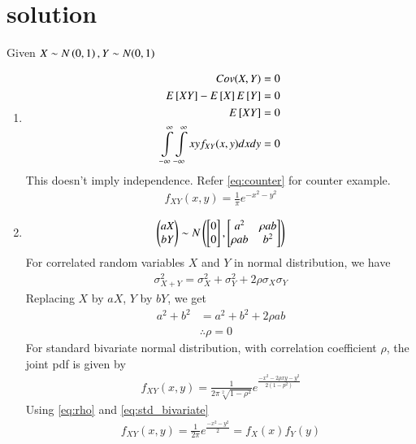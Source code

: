 \documentclass[journal,12pt,twocolumn]{IEEEtran}
\begin{document}
\section{solution}
Given $X\sim N\left(0,1\right), Y\sim N(0,1)$
\begin{enumerate}
\item
\begin{align}
Cov(X,Y)=0\\
E{}\left[XY\right]-E{}\left[X\right]E{}\left[Y\right]=0\\
E{}\left[XY\right]=0\\
\displaystyle \int\limits_{-\infty}^{\infty} \int\limits_{-\infty}^{\infty}xyf_{XY}(x,y) dxdy=0
\end{align}
This doesn't imply independence. Refer \eqref{eq:counter} for counter example.
\begin{align}
f_{XY}(x,y)=\frac{1}{\pi}e^{-x^2-y^2} \label{eq:counter}
\end{align}
\item
\begin{align}
\begin{pmatrix}
aX\\
bY
\end{pmatrix}
\sim N\left(\begin{bmatrix}0\\0\end{bmatrix},\begin{bmatrix}a^2&\rho ab\\\rho ab&b^2\end{bmatrix}\right)
\end{align}
For correlated random variables $X$ and $Y$ in normal distribution, we have
\begin{align}
\sigma_{X+Y}^2=\sigma_X^2+\sigma_Y^2+2\rho\sigma_X\sigma_Y
\end{align}
Replacing $X$ by $aX$, $Y$ by $bY$, we get
\begin{align}
a^2+b^2&=a^2+b^2+2\rho ab\\
&\therefore \rho=0\label{eq:rho}
\end{align}
For standard bivariate normal distribution, with correlation coefficient $\rho$, the joint pdf is given by
\begin{align}
f_{XY}(x,y)=\frac{1}{2\pi\sqrt[2]{1-\rho^2}}e^{\frac{-x^2-2\rho xy-y^2}{2(1-p^2)}}\label{eq:std_bivariate}
\end{align}
Using \eqref{eq:rho} and \eqref{eq:std_bivariate}
\begin{align}
f_{XY}(x,y)=\frac{1}{2\pi}e^{\frac{-x^2-y^2}{2}}=f_X(x)f_Y(y)
\end{align}

\end{enumerate}
\end{document}
